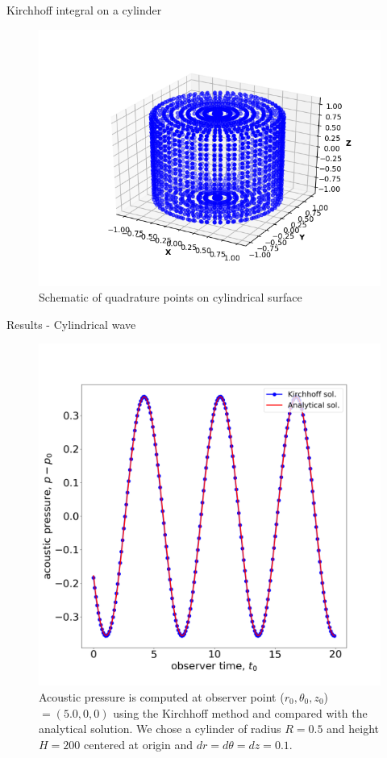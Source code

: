\documentclass[10pt, aspectratio=169]{beamer}
\begin{document}
\begin{frame}{Kirchhoff integral on a cylinder}

	\begin{figure}
		\centering
		\includegraphics[scale=0.5]{images/quadpoints.png}
		\caption{Schematic of quadrature points on cylindrical surface}
	\end{figure}
\end{frame}


\begin{frame}{Results - Cylindrical wave}
	\begin{figure}
		\centering
		\includegraphics[scale=0.15]{images/Hankel.png}
		\caption{Acoustic pressure is computed at observer point ($r_{0}, \theta_{0}, z_{0}$) $= (5.0, 0, 0)$ using the Kirchhoff method and compared with the analytical solution. We chose a cylinder of radius $R = 0.5$ and height $H = 200$ centered at origin and $dr = d\theta = dz = 0.1$.}
	\end{figure}
\end{frame}
\end{document}
